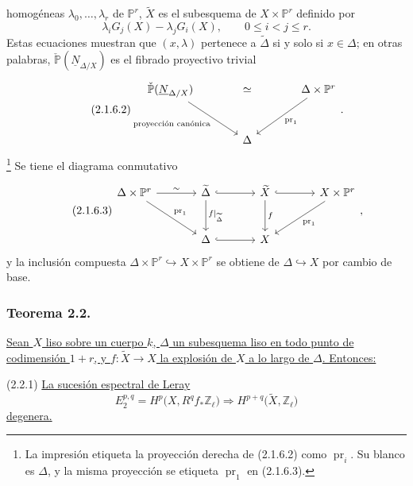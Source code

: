 homogéneas $\lambda_0,\ldots,\lambda_r$ de $\mathbb P^r$,
$\widetilde X$ es el subesquema de $X\times\mathbb P^r$ definido por
\begin{equation}\tag{2.1.6.1}
\lambda_iG_j(X)-\lambda_jG_i(X),
\qquad 0\leq i<j\leq r.
\end{equation}
Estas ecuaciones muestran que $(x,\lambda)$ pertenece a
$\widetilde\Delta$ si y solo si $x\in\Delta$; en otras palabras,
$\check{\mathbb P}(\underline N_{\Delta/X})$ es el fibrado proyectivo
trivial
\begin{equation}\tag{2.1.6.2}
\begin{tikzcd}[column sep=large,row sep=large]
\check{\mathbb P}(\underline N_{\Delta/X})
  \arrow[rr,phantom,"\simeq"]
  \arrow[dr,"\text{proyección canónica}"']
  & {} &
\Delta\times\mathbb P^r
  \arrow[dl,"\sisi{\operatorname{pr}_i}{\operatorname{pr}_1}"]\\
{} & \Delta & {}
\end{tikzcd}.
\end{equation}
\footnote{La impresión etiqueta la proyección derecha de (2.1.6.2)
como $\operatorname{pr}_i$. Su blanco es $\Delta$, y la misma
proyección se etiqueta $\operatorname{pr}_1$ en (2.1.6.3).}
Se tiene el diagrama conmutativo
\begin{equation}\tag{2.1.6.3}
\begin{tikzcd}[column sep=large,row sep=large]
\Delta\times\mathbb P^r
  \arrow[r,"\sim"]
  \arrow[dr,"\operatorname{pr}_1"]
&
\widetilde\Delta
  \arrow[r,hook]
  \arrow[d,"f|_{\widetilde\Delta}"]
&
\widetilde X
  \arrow[r,hook]
  \arrow[d,"f"]
&
X\times\mathbb P^r
  \arrow[dl,"\operatorname{pr}_1"]
\\
{} & \Delta \arrow[r,hook] & X & {}
\end{tikzcd},
\end{equation}
y la inclusión compuesta
$\Delta\times\mathbb P^r\hookrightarrow X\times\mathbb P^r$ se obtiene
de $\Delta\hookrightarrow X$ por cambio de base.

\subsubsection*{Teorema 2.2.}
\underline{Sean $X$ liso sobre un cuerpo $k$, $\Delta$ un subesquema
liso en todo punto de codimensión $1+r$, y
$f:\widetilde X\longrightarrow X$ la explosión de $X$ a lo largo de
$\Delta$. Entonces:}

\medskip
\noindent(2.2.1) \underline{La sucesión espectral de Leray}
\[
E_2^{p,q}=H^p\bigl(X,R^qf_*\mathbb Z_\ell\bigr)
\Longrightarrow
H^{p+q}\bigl(\widetilde X,\mathbb Z_\ell\bigr)
\]
\underline{degenera.}

